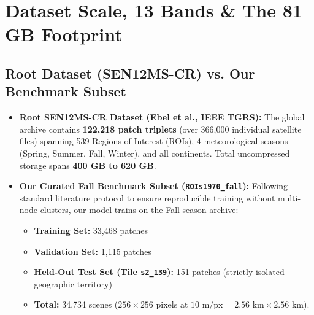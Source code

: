 \documentclass[11pt,a4paper]{article}
\begin{document}
\section{Dataset Scale, 13 Bands \& The 81 GB Footprint}

\subsection{Root Dataset (SEN12MS-CR) vs. Our Benchmark Subset}
\begin{itemize}[leftmargin=1.5em]
    \item \textbf{Root SEN12MS-CR Dataset (Ebel et al., IEEE TGRS):} The global archive contains \textbf{122,218 patch triplets} (over 366,000 individual satellite files) spanning 539 Regions of Interest (ROIs), 4 meteorological seasons (Spring, Summer, Fall, Winter), and all continents. Total uncompressed storage spans \textbf{400 GB to 620 GB}.
    \item \textbf{Our Curated Fall Benchmark Subset (\texttt{ROIs1970\_fall}):} Following standard literature protocol to ensure reproducible training without multi-node clusters, our model trains on the Fall season archive:
    \begin{itemize}
        \item \textbf{Training Set:} 33,468 patches
        \item \textbf{Validation Set:} 1,115 patches
        \item \textbf{Held-Out Test Set (Tile \texttt{s2\_139}):} 151 patches (strictly isolated geographic territory)
        \item \textbf{Total:} 34,734 scenes ($256 \times 256$ pixels at $10\text{ m/px} = 2.56\text{ km} \times 2.56\text{ km}$).
    \end{itemize}
\end{itemize}
\end{document}
